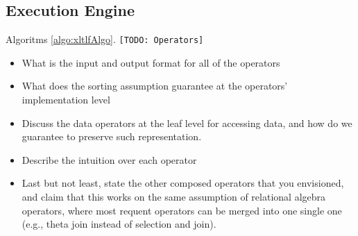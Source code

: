 
\subsection{Execution Engine} \label{ssec:xltlf}
Algoritms \ref{algo:xltlfAlgo}. \texttt{\color{red}[TODO: \xLTLf Operators]} 

\begin{itemize}
	\item What is the input and output format for all of the operators
	\item What does the sorting assumption guarantee at the operators' implementation level
	\item Discuss the data operators at the leaf level for accessing data, and how do we guarantee to preserve such representation.
	\item Describe the intuition over each operator
	\item Last but not least, state the other composed operators that you envisioned, and claim that this works on the same assumption of relational algebra operators, where most requent operators can be merged into one single one (e.g., theta join instead of selection and join).
\end{itemize}